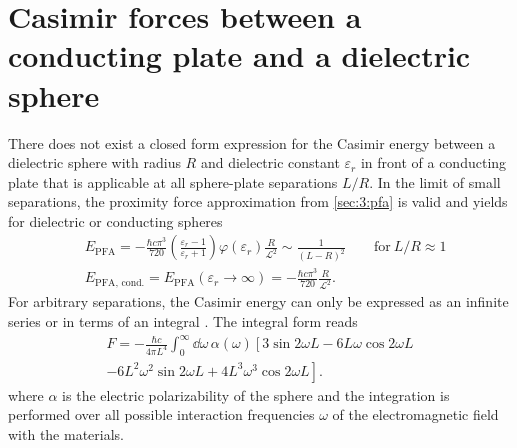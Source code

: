 \section{Casimir forces between a conducting plate and a dielectric sphere} \label{sec:3:casimir-plate-sphere}

There does not exist a closed form expression for the Casimir energy between a dielectric sphere with radius $R$ and dielectric constant $\varepsilon_r$ in front of a conducting plate that is applicable at all sphere-plate separations $L/R$.
In the limit of small separations, the proximity force approximation from \cref{sec:3:pfa} is valid and yields for dielectric or conducting spheres
\begin{align}\label{eq:3:casimir-sphere-plate-PFA}
  &E_\mathrm{PFA} = -\frac{\hbar c \pi^3}{720} \left(\frac{\varepsilon_r - 1}{\varepsilon_r + 1}\right)\varphi(\varepsilon_r) \frac{R}{\mathscr{L}^2} \sim \frac{1}{(L-R)^2} \quad\quad \text{for}\ L/R \approx 1 \\ \label{eq:3:casimir-sphere-plate-PFA-conducting}
  &E_\mathrm{PFA,\,cond.} = E_\mathrm{PFA}(\varepsilon_r \rightarrow \infty) = -\frac{\hbar c \pi^3}{720} \frac{R}{\mathscr{L}^2} .
\end{align}
For arbitrary separations, the Casimir energy can only be expressed as an infinite series \cite{Emig_2007,Emig_2007a} or in terms of an integral \cite{Ford_1998}.
The integral form reads
\begin{multline}\label{eq:3:ford-integral}
  F = - \frac{\hbar c}{4 \pi L^4} \int_{0}^{\infty} \dd \omega \, \alpha(\omega) \left[3\sin 2 \omega L - 6L\omega \cos 2 \omega L \right. \\ 
  \left. - 6L^2\omega^2 \sin 2 \omega L + 4L^3\omega^3 \cos 2 \omega L\right].
\end{multline}
where $\alpha$ is the electric polarizability of the sphere and the integration is performed over all possible interaction frequencies $\omega$ of the electromagnetic field with the materials.

